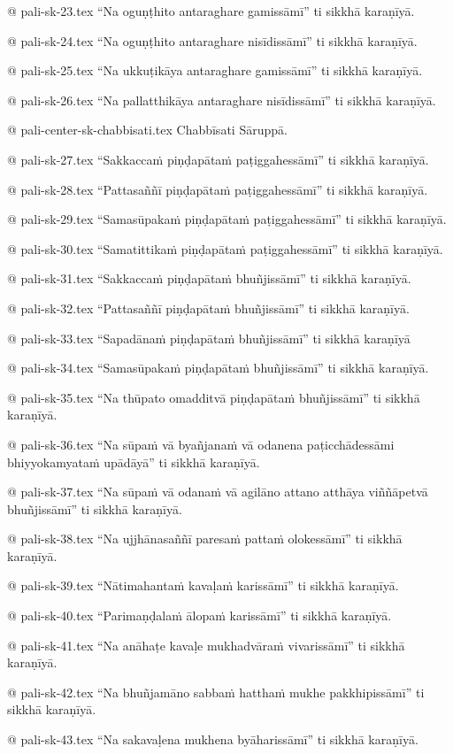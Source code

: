 @ pali-sk-23.tex
“Na oguṇṭhito antaraghare gamissāmī” ti sikkhā karaṇīyā.

@ pali-sk-24.tex
“Na oguṇṭhito antaraghare nisīdissāmī” ti sikkhā karaṇīyā.

@ pali-sk-25.tex
“Na ukkuṭikāya antaraghare gamissāmī” ti sikkhā karaṇīyā.

@ pali-sk-26.tex
“Na pallatthikāya antaraghare nisīdissāmī” ti sikkhā karaṇīyā.

@ pali-center-sk-chabbisati.tex
Chabbīsati Sāruppā.

@ pali-sk-27.tex
“Sakkaccaṁ piṇḍapātaṁ paṭiggahessāmī” ti sikkhā karaṇīyā.

@ pali-sk-28.tex
“Pattasaññī piṇḍapātaṁ paṭiggahessāmī” ti sikkhā karaṇīyā.

@ pali-sk-29.tex
“Samasūpakaṁ piṇḍapātaṁ paṭiggahessāmī” ti sikkhā karaṇīyā.

@ pali-sk-30.tex
“Samatittikaṁ piṇḍapātaṁ paṭiggahessāmī” ti sikkhā karaṇīyā.

@ pali-sk-31.tex
“Sakkaccaṁ piṇḍapātaṁ bhuñjissāmī” ti sikkhā karaṇīyā.

@ pali-sk-32.tex
“Pattasaññī piṇḍapātaṁ bhuñjissāmī” ti sikkhā karaṇīyā.

@ pali-sk-33.tex
“Sapadānaṁ piṇḍapātaṁ bhuñjissāmī” ti sikkhā karaṇīyā

@ pali-sk-34.tex
“Samasūpakaṁ piṇḍapātaṁ bhuñjissāmī” ti sikkhā karaṇīyā.

@ pali-sk-35.tex
“Na thūpato omadditvā piṇḍapātaṁ bhuñjissāmī” ti sikkhā karaṇīyā.

@ pali-sk-36.tex
“Na sūpaṁ vā byañjanaṁ vā odanena paṭicchādessāmi bhiyyokamyataṁ upādāyā” ti sikkhā karaṇīyā.

@ pali-sk-37.tex
“Na sūpaṁ vā odanaṁ vā agilāno attano atthāya viññāpetvā bhuñjissāmī” ti sikkhā karaṇīyā.

@ pali-sk-38.tex
“Na ujjhānasaññī paresaṁ pattaṁ olokessāmī” ti sikkhā karaṇīyā.

@ pali-sk-39.tex
“Nātimahantaṁ kavaḷaṁ karissāmī” ti sikkhā karaṇīyā.

@ pali-sk-40.tex
“Parimaṇḍalaṁ ālopaṁ karissāmī” ti sikkhā karaṇīyā.

@ pali-sk-41.tex
“Na anāhaṭe kavaḷe mukhadvāraṁ vivarissāmī” ti sikkhā karaṇīyā.

@ pali-sk-42.tex
“Na bhuñjamāno sabbaṁ hatthaṁ mukhe pakkhipissāmī” ti sikkhā karaṇīyā.

@ pali-sk-43.tex
“Na sakavaḷena mukhena byāharissāmī” ti sikkhā karaṇīyā.

